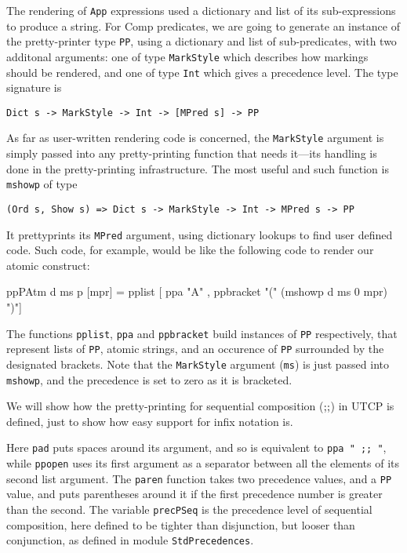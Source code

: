 The rendering of \texttt{App} expressions used a dictionary and list of its
sub-expressions to produce a string.
For Comp predicates, we are going to generate an instance
of the pretty-printer type \texttt{PP}, using a dictionary
and list of sub-predicates,
with two additonal arguments:
one of type \texttt{MarkStyle} which describes how markings should be rendered,
and one of type \texttt{Int} which gives a precedence level.
The type signature is
\begin{verbatim}
Dict s -> MarkStyle -> Int -> [MPred s] -> PP
\end{verbatim}
As far as user-written rendering code is concerned,
the \texttt{MarkStyle} argument is simply passed into any pretty-printing
function that needs it---its handling is done in the pretty-printing
infrastructure.
The most useful and such function is \texttt{mshowp} of type
\begin{verbatim}
(Ord s, Show s) => Dict s -> MarkStyle -> Int -> MPred s -> PP
\end{verbatim}
It prettyprints its \texttt{MPred} argument, using dictionary lookups
to find user defined code.
Such code, for example, would be like the following code
to render our atomic construct:
\begin{code}
ppPAtm d ms p [mpr]
 = pplist [ ppa "A"
          , ppbracket "(" (mshowp d ms 0 mpr) ")"]
\end{code}
The functions \texttt{pplist}, \texttt{ppa} and \texttt{ppbracket}
build instances of \texttt{PP} respectively,
that represent lists of \texttt{PP}, 
atomic strings,
and an occurence of \texttt{PP} surrounded by the designated brackets.
Note that the \texttt{MarkStyle} argument (\texttt{ms}) 
is just passed into \texttt{mshowp},
and the precedence is set to zero as it is bracketed.



We will show how the pretty-printing for
sequential composition  ($\mathrel{\mathbf{;\!;}}$) in UTCP is defined,
just to show how easy support for infix notation is.
Here \texttt{pad} puts spaces around its argument,
and so is equivalent to \verb$ppa " ;; "$,
while \texttt{ppopen} uses its first argument as a
separator between all the elements of its second list argument.
The \texttt{paren} function takes two precedence values,
and a \texttt{PP} value, and puts parentheses around it if the first precedence
number is greater than the second.
The variable \texttt{precPSeq} is the precedence level of sequential composition,
here defined to be tighter than disjunction,
but looser than conjunction, as defined in module \texttt{StdPrecedences}.

